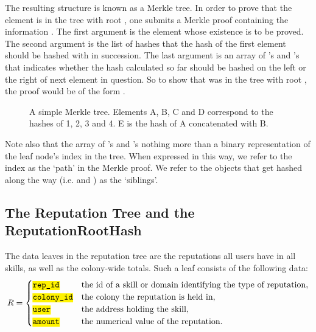 The resulting structure is known as a Merkle tree. In order to prove that the element  is in the tree with root , one submits a Merkle proof containing the information . The first argument is the element whose existence is to be proved. The second argument is the list of hashes that the hash of the first element should be hashed with in succession. The last argument is an array of 's and 's that indicates whether the hash calculated so far should be hashed on the left or the right of next element in question. So to show that  was in the tree with root , the proof would be of the form .
\begin{figure}
\centering
 \caption{A simple Merkle tree. Elements A, B, C and D correspond to the hashes of 1, 2, 3 and 4. E is the hash of A concatenated with B.}
 \label{fig:merkleexample}
\end{figure}

Note also that the array of 's and 's nothing more than a binary representation of the leaf node's index in the tree. When expressed in this way, we refer to the index as the `path' in the Merkle proof. We refer to the objects that get hashed along the way (i.e.  and ) as the `siblings'.


\subsection{The Reputation Tree and the ReputationRootHash}\label{sec:reptree}
The data leaves in the reputation tree are the reputations all users have in all skills, as well as the colony-wide totals. Such a leaf consists of the following data:
\[
R = 
\begin{cases}
 \ascode{rep\_id} & \textnormal{the id of a skill or domain identifying the type of reputation},\\
 \ascode{colony\_id} & \textnormal{the colony the reputation is held in},\\
 \ascode{user} & \textnormal{the address holding the skill},\\
 \ascode{amount} & \textnormal{the numerical value of the reputation}.
\end{cases}
\]

